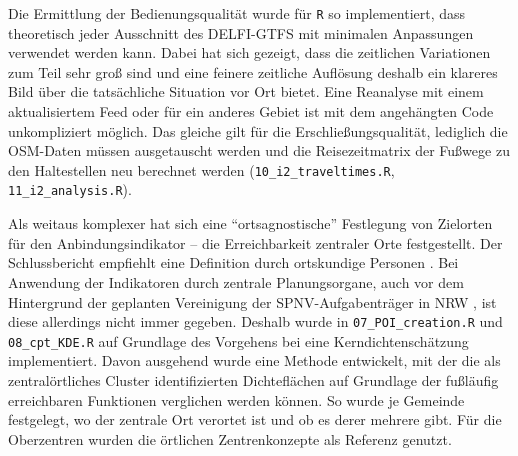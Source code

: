 \documentclass[11pt,pdftex,a4paper]{scrartcl}
\begin{document}
Die Ermittlung der Bedienungsqualität wurde für \texttt{R} so implementiert, dass theoretisch jeder Ausschnitt des DELFI-GTFS mit minimalen Anpassungen verwendet werden kann. Dabei hat sich gezeigt, dass die zeitlichen Variationen zum Teil sehr groß sind und eine feinere zeitliche Auflösung deshalb ein klareres Bild über die tatsächliche Situation vor Ort bietet. Eine Reanalyse mit einem aktualisiertem Feed oder für ein anderes Gebiet ist mit dem angehängten Code unkompliziert möglich. Das gleiche gilt für die Erschließungsqualität, lediglich die OSM-Daten müssen ausgetauscht werden und die Reisezeitmatrix der Fußwege zu den Haltestellen neu berechnet werden (\texttt{10\_i2\_traveltimes.R}, \texttt{11\_i2\_analysis.R}).

Als weitaus komplexer hat sich eine \enquote{ortsagnostische} Festlegung von Zielorten für den Anbindungsindikator -- die Erreichbarkeit zentraler Orte festgestellt. Der Schlussbericht empfiehlt eine Definition durch ortskundige Personen \parencite[74]{kcwgmbhMethodikUndEmpfehlungen2024}. Bei Anwendung der Indikatoren durch zentrale Planungsorgane, auch vor dem Hintergrund der geplanten Vereinigung der SPNV-Aufgabenträger in NRW \parencite[§6]{ÖPNVGNRW}, ist diese allerdings nicht immer gegeben. Deshalb wurde in \texttt{07\_POI\_creation.R} und \texttt{08\_cpt\_KDE.R} auf Grundlage des Vorgehens bei \textcite{Flex2016} eine Kerndichtenschätzung implementiert.  Davon ausgehend wurde eine Methode entwickelt, mit der die als zentralörtliches Cluster identifizierten Dichteflächen auf Grundlage der fußläufig erreichbaren Funktionen verglichen werden können. So wurde je Gemeinde festgelegt, wo der zentrale Ort verortet ist und ob es derer mehrere gibt. Für die Oberzentren wurden die örtlichen Zentrenkonzepte als Referenz genutzt. 
\end{document}
